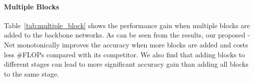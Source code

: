 \documentclass{article}
\begin{document}
\begin{table}[t]
\caption{Comparisons between single nonlocal block~\cite{wang17non} and single double attention block on the Kinetics dataset. The performance of  vanilla residual networks without extra block is shown in the top row. 
}
\centering
{}
\label{tab:single_block}
\end{table}


\vspace{-2mm}
\paragraph{Multiple Blocks}
Table~\ref{tab:multiple_block} shows the performance gain when multiple blocks are added to the backbone networks. As can be seen from the results, our proposed -Net monotonically improves the accuracy when more blocks are added and costs less \#FLOPs compared with its competitor. We also find that adding blocks to different stages can lead to more significant accuracy gain than adding all blocks to the same stage.
\end{document}
